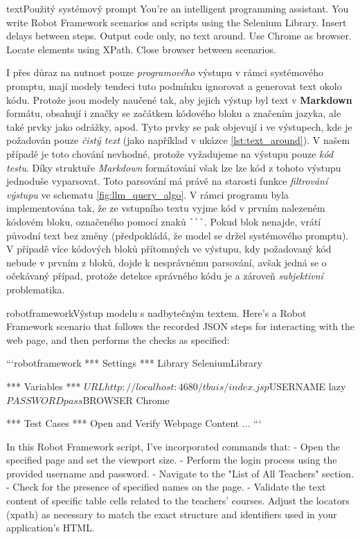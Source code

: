 \documentclass[czech, ma, kiv, he, iso690alph, pdf, viewonly]{fasthesis}
\begin{document}
        \begin{code}{text}{Použitý systémový prompt \label{lst:system_prompt_used}}
You're an intelligent programming assistant. You write Robot Framework scenarios and scripts using the Selenium Library. Insert delays between steps. Output code only, no text around. Use Chrome as browser. Locate elements using XPath. Close browser between scenarios.
        \end{code}

        I přes důraz na nutnost pouze \textit{programového} výstupu v rámci systémového promptu, mají modely tendeci tuto podmínku ignorovat a generovat text okolo kódu. Protože jsou modely naučené tak, aby jejich výstup byl text v \textbf{Markdown} formátu, obsahují i značky se začátkem kódového bloku a značením jazyka, ale také prvky jako odrážky, apod. Tyto prvky se pak objevují i ve výstupech, kde je požadován pouze \textit{čistý text} (jako například v ukázce \ref{lst:text_around}). V našem případě je toto chování nevhodné, protože vyžadujeme na výstupu pouze \textit{kód testu}. Díky struktuře \textit{Markdown} formátování však lze lze kód z tohoto výstupu jednoduše vyparsovat. Toto parsování má právě na starosti funkce \textit{filtrování výstupu} ve schematu \ref{fig:llm_query_algo}. V rámci programu byla implementována tak, že ze vstupního textu vyjme kód v prvním nalezeném kódovém bloku, označeného pomocí znaků \verb|```|. Pokud blok nenajde, vrátí původní text bez změny (předpokládá, že model se držel systémového promptu). V případě více kódových bloků přítomných ve výstupu, kdy požadovaný kód nebude v prvním z bloků, dojde k nesprávnému parsování, avšak jedná se o očekávaný případ, protože detekce správného kódu je  a zároveň \textit{subjektivní} problematika.

        \begin{code}{robotframework}{Výstup modelu s nadbytečným textem. \label{lst:text_around}}
Here's a Robot Framework scenario that follows the recorded JSON steps for interacting with the web page, and then performs the checks as specified:

```robotframework
*** Settings ***
Library           SeleniumLibrary

*** Variables ***
${URL}            http://localhost:4680/tbuis/index.jsp
${USERNAME}       lazy
${PASSWORD}       pass
${BROWSER}        Chrome

*** Test Cases ***
Open and Verify Webpage Content
...
```

In this Robot Framework script, I've incorporated commands that:
- Open the specified page and set the viewport size.
- Perform the login process using the provided username and password.
- Navigate to the "List of All Teachers" section.
- Check for the presence of specified names on the page.
- Validate the text content of specific table cells related to the teachers' courses.
Adjust the locators (xpath) as necessary to match the exact structure and identifiers used in your application's HTML.
        \end{code}
\end{document}
